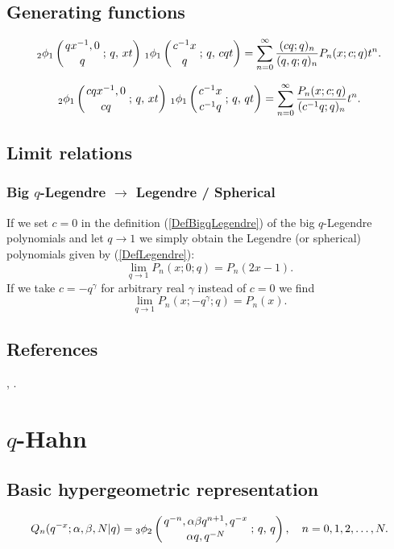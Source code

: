 \documentclass[envcountchap,graybox]{svmono}
\newcommand{\qhyp}[5]{\mbox{}_{#1}{\phi}_{#2}
\left(\genfrac{}{}{0pt}{}{#3}{#4}\,;\,q,\,#5\right)}
\newcommand{\qhyp}[5]{\,\mbox{}_{#1}\phi_{#2}\!\left(
  \genfrac{}{}{0pt}{}{#3}{#4};#5\right)}
\begin{document}
\subsection*{Generating functions}
\begin{equation}
\label{GenBigqLegendre1}
\qhyp{2}{1}{qx^{-1},0}{q}{xt}\,\qhyp{1}{1}{c^{-1}x}{q}{cqt}
=\sum_{n=0}^{\infty}\frac{(cq;q)_n}{(q,q;q)_n}P_n(x;c;q)t^n.
\end{equation}

\begin{equation}
\label{GenBigqLegendre2}
\qhyp{2}{1}{cqx^{-1},0}{cq}{xt}\,\qhyp{1}{1}{c^{-1}x}{c^{-1}q}{qt}
=\sum_{n=0}^{\infty}\frac{P_n(x;c;q)}{(c^{-1}q;q)_n}t^n.
\end{equation}

\subsection*{Limit relations}

\subsubsection*{Big $q$-Legendre $\rightarrow$ Legendre / Spherical}
If we set $c=0$ in the definition (\ref{DefBigqLegendre}) of the big
$q$-Legendre polynomials and let $q\rightarrow 1$ we simply obtain the Legendre
(or spherical) polynomials given by (\ref{DefLegendre}):
\begin{equation}
\lim_{q\rightarrow 1}P_n(x;0;q)=P_n(2x-1).
\end{equation}
If we take $c=-q^{\gamma}$ for arbitrary real $\gamma$ instead of $c=0$ we
find
\begin{equation}
\lim_{q\rightarrow 1}P_n(x;-q^{\gamma};q)=P_n(x).
\end{equation}

\subsection*{References}
\cite{Koelink95I}, \cite{Koorn90II}.


\section{$q$-Hahn}
\par\setcounter{equation}{0}

\subsection*{Basic hypergeometric representation}
\begin{equation}
\label{DefqHahn}
Q_n(q^{-x};\alpha,\beta,N|q)=\qhyp{3}{2}{q^{-n},\alpha\beta q^{n+1},q^{-x}}
{\alpha q,q^{-N}}{q},\quad n=0,1,2,\ldots,N.
\end{equation}
\end{document}
